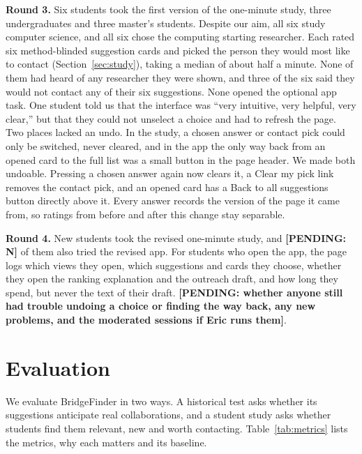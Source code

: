 \documentclass[sigconf,nonacm]{acmart}
\newcommand{\pending}[1]{\textcolor{red!70!black}{\textbf{[PENDING: #1]}}}
\begin{document}
\textbf{Round 3.} Six students took the first version of the one-minute study, three undergraduates and three master's students. Despite our aim, all six study computer science, and all six chose the computing starting researcher. Each rated six method-blinded suggestion cards and picked the person they would most like to contact (Section~\ref{sec:study}), taking a median of about half a minute. None of them had heard of any researcher they were shown, and three of the six said they would not contact any of their six suggestions. None opened the optional app task. One student told us that the interface was ``very intuitive, very helpful, very clear,'' but that they could not unselect a choice and had to refresh the page. Two places lacked an undo. In the study, a chosen answer or contact pick could only be switched, never cleared, and in the app the only way back from an opened card to the full list was a small button in the page header. We made both undoable. Pressing a chosen answer again now clears it, a Clear my pick link removes the contact pick, and an opened card has a Back to all suggestions button directly above it. Every answer records the version of the page it came from, so ratings from before and after this change stay separable.

\textbf{Round 4.} New students took the revised one-minute study, and \pending{N} of them also tried the revised app. For students who open the app, the page logs which views they open, which suggestions and cards they choose, whether they open the ranking explanation and the outreach draft, and how long they spend, but never the text of their draft. \pending{whether anyone still had trouble undoing a choice or finding the way back, any new problems, and the moderated sessions if Eric runs them}.

\section{Evaluation}\label{sec:eval}
We evaluate BridgeFinder in two ways. A historical test asks whether its suggestions anticipate real collaborations, and a student study asks whether students find them relevant, new and worth contacting. Table~\ref{tab:metrics} lists the metrics, why each matters and its baseline.
\end{document}
